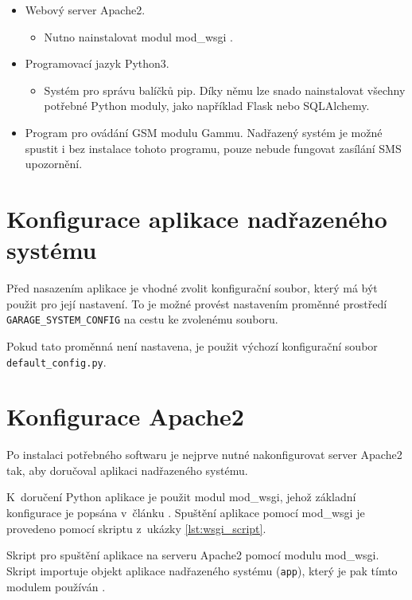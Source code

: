 \begin{itemize}
    \item Webový server Apache2.
    \begin{itemize}
        \item Nutno nainstalovat modul mod\_wsgi  \cite{mod_wsgi}.
    \end{itemize}
    \item Programovací jazyk Python3.
    \begin{itemize}
        \item Systém pro správu balíčků pip. Díky němu lze snado nainstalovat všechny potřebné Python moduly, jako například Flask nebo SQLAlchemy.
    \end{itemize}
    \item Program pro ovádání GSM modulu Gammu. Nadřazený systém je možné spustit i bez instalace tohoto programu, pouze nebude fungovat zasílání SMS upozornění.
\end{itemize}

\section{Konfigurace aplikace nadřazeného systému}
\label{sec:dp_appconfig}

Před nasazením aplikace je vhodné zvolit konfigurační soubor, který má být použit pro její nastavení. To je možné provést nastavením proměnné prostředí \texttt{GARAGE\_SYSTEM\_CONFIG} na cestu ke zvolenému souboru.

Pokud tato proměnná není nastavena, je použit výchozí konfigurační soubor \texttt{default\_config.py}.

\newpage

\section{Konfigurace Apache2}

Po instalaci potřebného softwaru je nejprve nutné nakonfigurovat server Apache2 tak, aby doručoval aplikaci nadřazeného systému. 

K~doručení Python aplikace je použit modul mod\_wsgi, jehož základní konfigurace je popsána v~článku \cite{flask_wsgi}. Spuštění aplikace pomocí mod\_wsgi je provedeno pomocí skriptu z~ukázky \ref{lst:wsgi_script}.

\begin{listing}[htbp]
\caption{\label{lst:wsgi_script} Skript pro spuštění aplikace na serveru Apache2 pomocí modulu mod\_wsgi. Skript importuje objekt aplikace nadřazeného systému (\texttt{app}), který je pak tímto modulem používán \cite{flask_wsgi}.}
\inputminted[bgcolor=codebg]{python}{source-samples/wsgi.py}
\end{listing}


